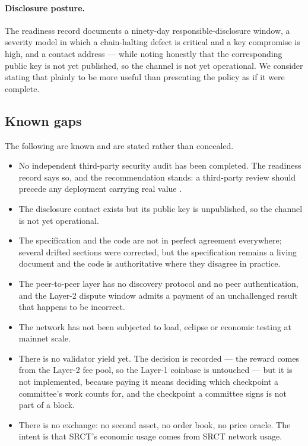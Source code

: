 \documentclass{article}
\begin{document}
\paragraph{Disclosure posture.} The readiness record documents a ninety-day
responsible-disclosure window, a severity model in which a chain-halting defect
is critical and a key compromise is high, and a contact address --- while
noting honestly that the corresponding public key is not yet published, so the
channel is not yet operational. We consider stating that plainly to be more
useful than presenting the policy as if it were complete.

\subsection{Known gaps}
\label{sec:gaps}

The following are known and are stated rather than concealed.

\begin{itemize}
\item No independent third-party security audit has been completed. The
readiness record says so, and the recommendation stands: a third-party review
should precede any deployment carrying real value \cite{srct-readiness}.
\item The disclosure contact exists but its public key is unpublished, so the
channel is not yet operational.
\item The specification and the code are not in perfect agreement everywhere;
several drifted sections were corrected, but the specification remains a
living document and the code is authoritative where they disagree in
practice.
\item The peer-to-peer layer has no discovery protocol and no peer
authentication, and the Layer-2 dispute window admits a payment of an
unchallenged result that happens to be incorrect.
\item The network has not been subjected to load, eclipse or economic testing
at mainnet scale.
\item There is no validator yield yet. The decision is recorded --- the reward
comes from the Layer-2 fee pool, so the Layer-1 coinbase is untouched --- but
it is not implemented, because paying it means deciding which checkpoint a
committee's work counts for, and the checkpoint a committee signs is not part
of a block.
\item There is no exchange: no second asset, no order book, no price oracle.
The intent is that SRCT's economic usage comes from SRCT network usage.
\end{itemize}
\end{document}
